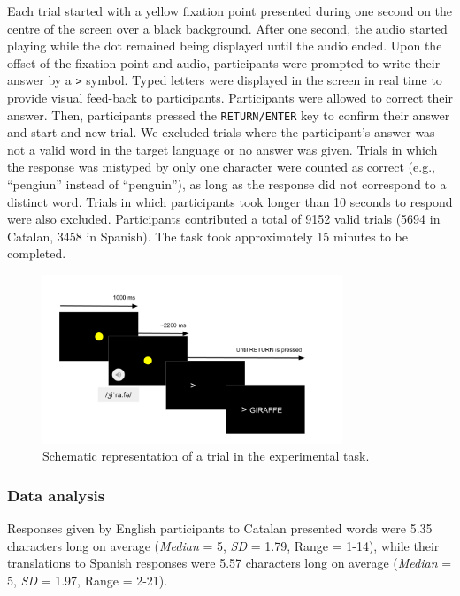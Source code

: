 \documentclass[
]{article}
\begin{document}
Each trial started with a yellow fixation point presented during one
second on the centre of the screen over a black background. After one
second, the audio started playing while the dot remained being displayed
until the audio ended. Upon the offset of the fixation point and audio,
participants were prompted to write their answer by a
\texttt{\textgreater{}} symbol. Typed letters were displayed in the
screen in real time to provide visual feed-back to participants.
Participants were allowed to correct their answer. Then, participants
pressed the \texttt{RETURN/ENTER} key to confirm their answer and start
and new trial. We excluded trials where the participant's answer was not
a valid word in the target language or no answer was given. Trials in
which the response was mistyped by only one character were counted as
correct (e.g., ``pengiun'' instead of ``penguin''), as long as the
response did not correspond to a distinct word. Trials in which
participants took longer than 10 seconds to respond were also excluded.
Participants contributed a total of 9152 valid trials (5694 in Catalan,
3458 in Spanish). The task took approximately 15 minutes to be
completed.

\begin{figure}[H]

{\centering \includegraphics[width=0.8\textwidth,height=\textheight]{../img/design.png}

}

\caption{Schematic representation of a trial in the experimental task.}

\end{figure}%

\subsubsection{Data analysis}\label{data-analysis}

Responses given by English participants to Catalan presented words were
5.35 characters long on average (\emph{Median} = 5, \emph{SD} = 1.79,
Range = 1-14), while their translations to Spanish responses were 5.57
characters long on average (\emph{Median} = 5, \emph{SD} = 1.97, Range =
2-21).
\end{document}
